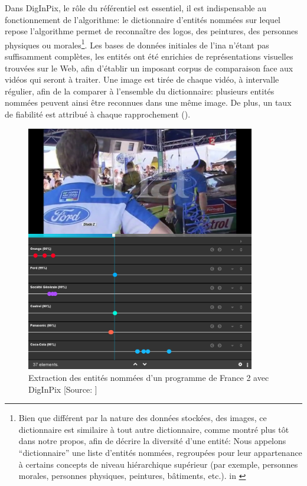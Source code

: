 Dans DigInPix, le rôle du référentiel est essentiel, il est indispensable au fonctionnement de l'algorithme: le dictionnaire d'entités nommées sur lequel repose l'algorithme permet de reconnaître des logos, des peintures, des personnes physiques ou morales\footnote{Bien que différent par la nature des données stockées, des images, ce dictionnaire est similaire à tout autre dictionnaire, comme montré plus tôt dans notre propos, afin de décrire la diversité d'une entité: \og Nous appelons “dictionnaire” une liste d'entités nommées, regroupées pour leur appartenance à certains concepts de niveau hiérarchique supérieur (par exemple, personnes morales, personnes physiques, peintures, bâtiments, etc.).\fg{} in \cite{institut_national_de_laudiovisuel_diginpix_nodate}}. Les bases de données initiales de l'\ac{ina} n'étant pas suffisamment complètes, les entités ont été enrichies de représentations visuelles trouvées sur le Web, afin d'établir un imposant corpus de comparaison face aux vidéos qui seront à traiter. Une image est tirée de chaque vidéo, à intervalle régulier, afin de la comparer à l'ensemble du dictionnaire: plusieurs entités nommées peuvent ainsi être reconnues dans une même image. De plus, un taux de fiabilité est attribué à chaque rapprochement ().
\begin{figure}[!h]
	\centering
	\includegraphics[width=10cm]{images/diginpix_resultat.jpg}
	\caption[Extraction des entités nommées d'un programme de France 2 avec DigInPix]{Extraction des entités nommées d'un programme de France 2 avec DigInPix [Source: \cite{institut_national_de_laudiovisuel_diginpix_nodate}]}
	\label{diginpix_result}
\end{figure}

